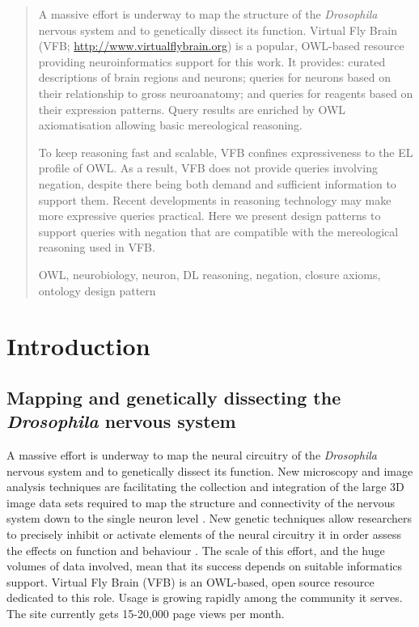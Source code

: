 \documentclass[runningheads,a4paper]{llncs}
\newcommand{\keywords}[1]{\par\addvspace\baselineskip
\noindent\keywordname\enspace\ignorespaces#1}
\begin{document}
\begin{abstract}
A massive effort is underway to map the structure of the \textit{Drosophila}
nervous system and to genetically dissect its function. Virtual Fly
Brain (VFB; \url{http://www.virtualflybrain.org}) is a popular, OWL-based resource
providing neuroinformatics support for this work.  It provides: curated
descriptions of brain regions and neurons; queries for neurons based
on their relationship to gross neuroanatomy; and queries for reagents
based on their expression patterns. Query results are enriched by OWL
axiomatisation allowing basic mereological reasoning.

To keep reasoning fast and scalable, VFB confines expressiveness to
the EL profile of OWL. As a result, VFB does not provide queries
involving negation, despite there being both demand and sufficient
information to support them. Recent developments in
reasoning technology may make more expressive queries practical.  Here
we present design patterns to support queries with negation that are
compatible with the mereological reasoning used in VFB.

\keywords{OWL, neurobiology, neuron, DL reasoning, negation, closure
  axioms, ontology design pattern}
\end{abstract}

\section{Introduction}


\subsection{Mapping and genetically dissecting the \textit{Drosophila}
  nervous system}


A massive effort is underway to map the neural circuitry of the
\textit{Drosophila} nervous system and to genetically dissect its
function. New microscopy and image analysis techniques are
facilitating the collection and integration of the large 3D image
data sets required to map the structure and connectivity of the
nervous system down to the single neuron level
\cite{pmid21129968,Manton2014}. New genetic
techniques allow researchers to precisely inhibit or activate elements of the
neural circuitry it in order assess the effects
on function and behaviour \cite{pmid22205518}. The scale of this 
effort, and the huge volumes of data involved, mean that its success
depends on suitable informatics support. Virtual Fly Brain (VFB)
\cite{pmid22180411,pmid22402613} is an OWL-based, open source
resource dedicated to this role. Usage is growing rapidly among the community
it serves.  The site currently gets 15-20,000 page views per month.
\end{document}
